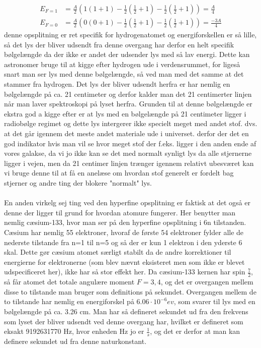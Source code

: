 \documentclass[../../Atom-ogMolekylefysik.tex]{subfiles}
\begin{document}
\begin{align*}
    E_{F=1}&=\frac{A}{2}(1(1+1)-\frac{1}{2}(\frac{1}{2}+1)-\frac{1}{2}(\frac{1}{2}+1))=\frac{A}{4}\\
    E_{F=0}&=\frac{A}{2}(0(0+1)-\frac{1}{2}(\frac{1}{2}+1)-\frac{1}{2}(\frac{1}{2}+1))=\frac{-3A}{4}
\end{align*}
denne opsplitning er ret specifik for hydrogenatomet og energiforskellen er så lille, så det lys der bliver udsendt fra denne overgang har derfor en helt specifik bølgelængde da der ikke er andet der udsender lys med så lav energi. Dette kan astronomer bruge til at kigge efter hydrogen ude i verdensrummet, for ligeså snart man ser lys med denne bølgelængde, så ved man med det samme at det stammer fra hydrogen. Det lys der bliver udsendt herfra er har nemlig en bølgelængde på ca. 21 centimeter og derfor kalder man det 21 centimerter linjen når man laver spektroskopi på lyset herfra. Grunden til at denne bølgelængde er ekstra god a kigge efter er at lys med en bølgelængde på 21 centimeter ligger i radiobølge regimet og dette lys intergerer ikke specielt meget med andet stof. dvs. at det går igennem det meste andet materiale ude i universet. derfor der det en god indikator hvis man vil se hvor meget stof der f.eks. ligger i den anden ende af vores galakse, da vi jo ikke kan se det med normalt synligt lys da alle stjernerne ligger i vejen, men da 21 centimer linjen trænger igennem relativt ubesværet kan vi bruge denne til at få en anelæse om hvordan stof generelt er fordelt bag stjerner og andre ting der blokere "normalt" lys.\\
\\
En anden virkelg sej ting ved den hyperfine opsplitning er faktisk at det også er denne der ligger til grund for hvordan atomure fungerer.  Her benytter man nemlig cæsium-133, hvor man ser på den hyperfine opsplitning i 6n tilstanden. Cæsium har nemlig 55 elektroner, hvoraf de første 54 elektroner fylder alle de nederste tilstande fra n=1 til n=5 og så der er kun 1 elektron i den yderste 6 skal. Dette gør cæsium atomet særligt stabilt da de andre korrektioner til energierne for elektronerne (som blev nævnt eksisteret men som ikke er blevet udspecificeret her), ikke har så stor effekt her. Da cæsium-133 kernen har spin $\frac{7}{2}$, så får atomet det totale angulære moment $F=3,4$, og det er overgangen mellem disse to tilstande man bruger som definitions på sekundet. Overgangen mellem de to tilstande har nemlig en energiforskel på $6.06\cdot10^{-6}ev$, som svarer til lys med en bølgelængde på ca. 3.26 cm. Man har så defineret sekundet ud fra den frekvens som lyset der bliver udsendt ved denne overgang har, hvilket er defineret som eksakt 9192631770 Hz, hvor enheden Hz jo er $\frac{1}{s}$, og det er derfor at man kan definere sekundet ud fra denne naturkonstant.
\end{document}
